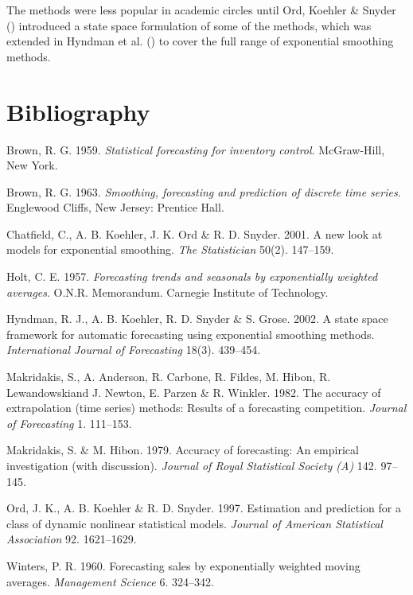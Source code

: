\documentclass[
  11pt,
  a4paper,
  nottoc]{report}
\newlength{\cslhangindent}
\newenvironment{CSLReferences}[2] %
 {\begin{list}{}{%
  \setlength{\itemindent}{0pt}
  \setlength{\leftmargin}{0pt}
  \setlength{\parsep}{0pt}
  \ifodd #1
   \setlength{\leftmargin}{\cslhangindent}
   \setlength{\itemindent}{-1\cslhangindent}
  \fi
  \setlength{\itemsep}{#2\baselineskip}}}
 {\end{list}}
\begin{document}
The methods were less popular in academic circles until Ord, Koehler \&
Snyder () introduced a state space formulation
of some of the methods, which was extended in Hyndman et al.
() to cover the full range of exponential
smoothing methods.


\chapter*{Bibliography}\label{bibliography}


\label{refs}
\begin{CSLReferences}{1}{0}
Brown, R. G. 1959. \emph{Statistical forecasting for inventory control}.
McGraw-Hill, New York.

Brown, R. G. 1963. \emph{Smoothing, forecasting and prediction of
discrete time series}. Englewood Cliffs, New Jersey: Prentice Hall.

Chatfield, C., A. B. Koehler, J. K. Ord \& R. D. Snyder. 2001. A new
look at models for exponential smoothing. \emph{The Statistician} 50(2).
147--159.

Holt, C. E. 1957. \emph{Forecasting trends and seasonals by
exponentially weighted averages}. O.N.R. Memorandum. Carnegie Institute
of Technology.

Hyndman, R. J., A. B. Koehler, R. D. Snyder \& S. Grose. 2002. A state
space framework for automatic forecasting using exponential smoothing
methods. \emph{International Journal of Forecasting} 18(3). 439--454.

Makridakis, S., A. Anderson, R. Carbone, R. Fildes, M. Hibon, R.
Lewandowskiand J. Newton, E. Parzen \& R. Winkler. 1982. The accuracy of
extrapolation (time series) methods: Results of a forecasting
competition. \emph{Journal of Forecasting} 1. 111--153.

Makridakis, S. \& M. Hibon. 1979. Accuracy of forecasting: An empirical
investigation (with discussion). \emph{Journal of Royal Statistical
Society (A)} 142. 97--145.

Ord, J. K., A. B. Koehler \& R. D. Snyder. 1997. Estimation and
prediction for a class of dynamic nonlinear statistical models.
\emph{Journal of American Statistical Association} 92. 1621--1629.

Winters, P. R. 1960. Forecasting sales by exponentially weighted moving
averages. \emph{Management Science} 6. 324--342.

\end{CSLReferences}
\end{document}
